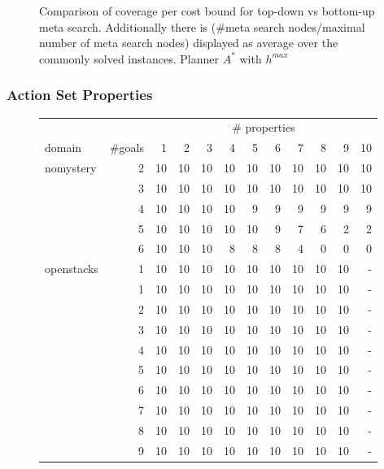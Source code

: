 \begin{figure}[ht]
	\small
	\centering
	
	\caption{Comparison of coverage per cost bound for top-down vs bottom-up meta search.
	Additionally there is (\#meta search nodes/maximal number of meta search nodes) displayed as average over the commonly solved instances.
	Planner $A^*$ with $h^{max}$}
\end{figure}



\FloatBarrier
\newpage
\subsubsection*{Action Set Properties}

\begin{figure}[ht]
	\begin{tabular}{l|r|rrrrrrrrrr}
		& & \multicolumn{10}{c}{\# properties} \\
		domain & \#goals & 1 & 2 & 3 & 4 & 5 & 6 & 7 & 8 & 9 & 10 \\\hline
		nomystery & 2 & 10 & 10 & 10 & 10 & 10 & 10 & 10 & 10 & 10 & 10\\\hline
				& 3 & 10 & 10 & 10 & 10 & 10 & 10 & 10 & 10 & 10 & 10\\\hline
				& 4 & 10 & 10 & 10 & 10 & 9 & 9 & 9 & 9 & 9 & 9\\\hline
				& 5 & 10 & 10 & 10 & 10 & 10 & 9 & 7 & 6 & 2 & 2\\\hline
				& 6 & 10 & 10 & 10 & 8 & 8 & 8 & 4 & 0 & 0 & 0\\\hline\hline
		openstacks & 1 & 10 & 10 & 10 & 10 & 10 & 10 & 10 & 10 & 10 & - \\\hline
				& 1 & 10 & 10 & 10 & 10 & 10 & 10 & 10 & 10 & 10 & - \\\hline
				& 2 & 10 & 10 & 10 & 10 & 10 & 10 & 10 & 10 & 10 & - \\\hline
				& 3 & 10 & 10 & 10 & 10 & 10 & 10 & 10 & 10 & 10 & - \\\hline
				& 4 & 10 & 10 & 10 & 10 & 10 & 10 & 10 & 10 & 10 & - \\\hline
				& 5 & 10 & 10 & 10 & 10 & 10 & 10 & 10 & 10 & 10 & - \\\hline
				& 6 & 10 & 10 & 10 & 10 & 10 & 10 & 10 & 10 & 10 & - \\\hline
				& 7 & 10 & 10 & 10 & 10 & 10 & 10 & 10 & 10 & 10 & - \\\hline
				& 8 & 10 & 10 & 10 & 10 & 10 & 10 & 10 & 10 & 10 & - \\\hline
				& 9 & 10 & 10 & 10 & 10 & 10 & 10 & 10 & 10 & 10 & - \\\hline\hline

\end{tabular}
\end{figure}
